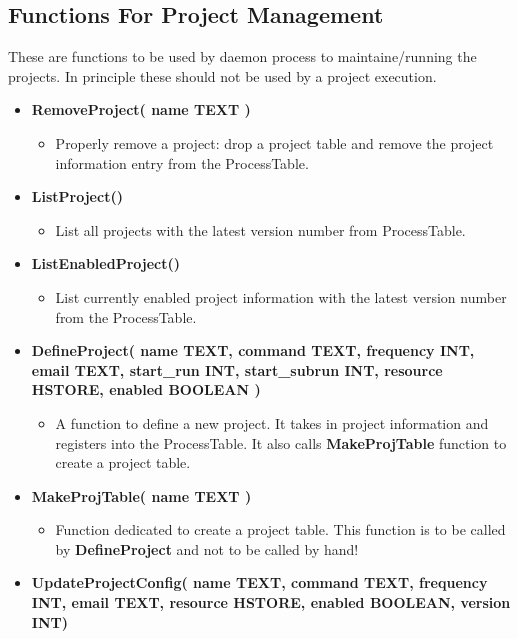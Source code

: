 \subsection{Functions For Project Management}
These are functions to be used by daemon process to maintaine/running the
projects. In principle these should not be used by a project execution. 
\begin{itemize}
  \item {\bf RemoveProject( name TEXT )} 
    \begin{itemize}
      \item Properly remove a project: drop a project table and remove the
        project information entry from the ProcessTable.
    \end{itemize}
  \item {\bf ListProject()}
    \begin{itemize}
      \item List all projects with the latest version number from ProcessTable.
    \end{itemize}
  \item {\bf ListEnabledProject()}
    \begin{itemize}
      \item List currently enabled project information with the latest version
        number from the ProcessTable.
    \end{itemize}
  \item {\bf DefineProject( name TEXT, command TEXT, frequency INT, email TEXT,
    start\_run INT, start\_subrun INT, resource HSTORE, enabled BOOLEAN )}
    \begin{itemize}
      \item A function to define a new project. It takes in project information
        and registers into the ProcessTable. It also calls {\bf MakeProjTable}
        function to create a project table.
    \end{itemize}
  \item {\bf MakeProjTable( name TEXT )}
    \begin{itemize}
      \item Function dedicated to create a project table. This function is
        to be called by {\bf DefineProject} and not to be called by hand!
    \end{itemize}
  \item {\bf UpdateProjectConfig( name TEXT, command TEXT, frequency INT, email
    TEXT, resource HSTORE, enabled BOOLEAN, version INT)}
    \begin{itemize}

\end{itemize}
\end{itemize}
